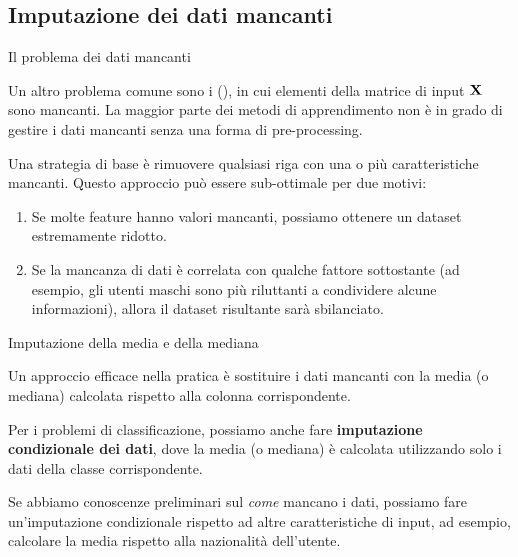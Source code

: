 \documentclass[12pt,aspectratio=169]{beamer}
\begin{document}
\subsection{Imputazione dei dati mancanti}

\begin{frame}{Il problema dei dati mancanti}
	
	Un altro problema comune sono i  (), in cui elementi della matrice di input $\boldsymbol{\mathbf{X}}$ sono mancanti. La maggior parte dei metodi di apprendimento non è in grado di gestire i dati mancanti senza una forma di pre-processing.
	
	Una strategia di base è rimuovere qualsiasi riga con una o più caratteristiche mancanti. Questo approccio può essere sub-ottimale per due motivi:
	\begin{enumerate}
		\item Se molte feature hanno valori mancanti, possiamo ottenere un dataset estremamente ridotto.
		\item Se la mancanza di dati è correlata con qualche fattore sottostante (ad esempio, gli utenti maschi sono più riluttanti a condividere alcune informazioni), allora il dataset risultante sarà sbilanciato.
	\end{enumerate}
	
\end{frame}

\begin{frame}{Imputazione della media e della mediana}
	
	Un approccio efficace nella pratica è sostituire i dati mancanti con la media (o mediana) calcolata rispetto alla colonna corrispondente.
	
	Per i problemi di classificazione, possiamo anche fare \textbf{imputazione condizionale dei dati}, dove la media (o mediana) è calcolata utilizzando solo i dati della classe corrispondente.
	
	Se abbiamo conoscenze preliminari sul \textit{come} mancano i dati, possiamo fare un'imputazione condizionale rispetto ad altre caratteristiche di input, ad esempio, calcolare la media rispetto alla nazionalità dell'utente.
	
\end{frame}
\end{document}
